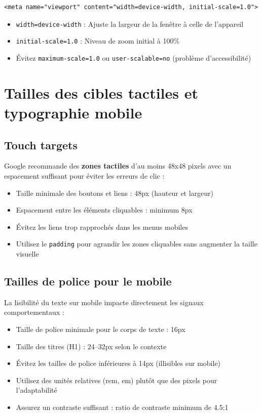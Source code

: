 \documentclass[12pt,a4paper,twoside]{report}
\newcommand{\keyword}[1]{\textbf{\textcolor{googleblue}{#1}}}
\begin{document}
\begin{lstlisting}[style=htmlcode,caption={Configuration correcte de la balise viewport}]
<meta name="viewport" content="width=device-width, initial-scale=1.0">
\end{lstlisting}

\begin{itemize}
    \item \texttt{width=device-width} : Ajuste la largeur de la fenêtre à celle de l'appareil
    \item \texttt{initial-scale=1.0} : Niveau de zoom initial à 100\%
    \item Évitez \texttt{maximum-scale=1.0} ou \texttt{user-scalable=no} (problème d'accessibilité)
\end{itemize}

\section{Tailles des cibles tactiles et typographie mobile}

\subsection{Touch targets}

Google recommande des \keyword{zones tactiles} d'au moins 48x48 pixels avec un espacement suffisant pour éviter les erreurs de clic :

\begin{itemize}
    \item Taille minimale des boutons et liens : 48px (hauteur et largeur)
    \item Espacement entre les éléments cliquables : minimum 8px
    \item Évitez les liens trop rapprochés dans les menus mobiles
    \item Utilisez le \texttt{padding} pour agrandir les zones cliquables sans augmenter la taille visuelle
\end{itemize}

\subsection{Tailles de police pour le mobile}

La lisibilité du texte sur mobile impacte directement les signaux comportementaux :

\begin{itemize}
    \item Taille de police minimale pour le corps de texte : 16px
    \item Taille des titres (H1) : 24--32px selon le contexte
    \item Évitez les tailles de police inférieures à 14px (illisibles sur mobile)
    \item Utilisez des unités relatives (rem, em) plutôt que des pixels pour l'adaptabilité
    \item Assurez un contraste suffisant : ratio de contraste minimum de 4.5:1
\end{itemize}
\end{document}
